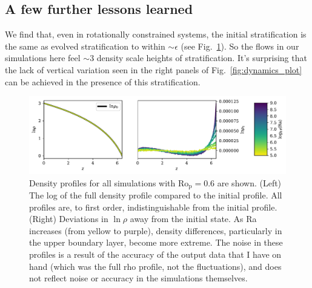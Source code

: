\subsection{A few further lessons learned}
We find that, even in rotationally constrained systems, the initial stratification is the same as evolved stratification to within $\sim\epsilon$ (see Fig.~\ref{fig:rot_density}). 
So the flows in our simulations here feel $\sim$3 density scale heights of stratification.
It's surprising that the lack of vertical variation seen in the right panels of Fig.~\ref{fig:dynamics_plot} can be achieved in the presence of this stratification.
\begin{figure}[b!]
\includegraphics[width=\textwidth]{./figs/revisions/rot_density.pdf}
\caption[Evolved density stratification in rotating convection simulations.]{ 
	Density profiles for all simulations with Ro$_{\text{p}} = 0.6$ are shown.
	(Left) The log of the full density profile compared to the initial profile.
	All profiles are, to first order, indistinguishable from the initial profile.
	(Right) Deviations in $\ln\rho$ away from the initial state.
	As Ra increases (from yellow to purple), density differences, particularly in the upper boundary layer, become more extreme.
	The noise in these profiles is a result of the accuracy of the output data that I have on hand (which was the full rho profile, not the fluctuations), and does not reflect noise or accuracy in the simulations themselves.
	\label{fig:rot_density} }
\end{figure}

